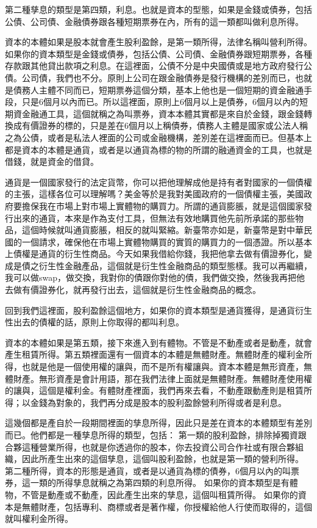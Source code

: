 \documentclass[]{ctexbook}
\begin{document}
第二種孳息的類型是第四類，利息。也就是資本的型態，如果是金錢或債券，包括公債、公司債、金融債券跟各種短期票券在內，所有的這一類都叫做利息所得。

資本的本體如果是股本就會產生股利盈餘，是第一類所得，法律名稱叫營利所得。如果你的資本類型是金錢或債券，包括公債、公司債、金融債券跟短期票券，各種存款跟其他貸出款項之利息。在這裡面，公債不分是中央國債或是地方政府發行公債。公司債，我們也不分。原則上公司在跟金融債券是發行機構的差別而已，也就是債務人主體不同而已，短期票券這個分類，基本上他也是一個短期的資金融通手段，只是6個月以內而已。所以這裡面，原則上6個月以上是債券，6個月以內的短期資金融通工具，這個就稱之為叫票券，資本本體其實都是來自於金錢，跟金錢轉換成有價證券的標的，只是差在6個月以上稱債券，債務人主體是國家或公法人稱之為公債，或者是私法人裡面的公司或金融機構，差別差在這裡面而已。但基本上都是資本的本體是通貨，或者是以通貨為標的物的所謂的融通資金的工具，也就是借錢，就是資金的借貸。

通貨是一個國家發行的法定貨幣，你可以把他理解成他是持有者對國家的一個債權的主張，這樣各位可以理解嗎？美金等於是我對美國政府的一個債權主張，美國政府要擔保我在市場上對市場上實體物的購買力。所謂的通貨膨脹，就是這個國家發行出來的通貨，本來是作為支付工具，但無法有效地購買他先前所承諾的那些物品，這個時候就叫通貨膨脹，相反的就叫緊縮。新臺幣亦如是，新臺幣是對中華民國的一個請求，確保他在市場上實體物購買的實質的購買力的一個憑證。所以基本上債權是通貨的衍生性商品。今天如果我借給你錢，我把他拿去做有價證券化，變成是債之衍生性金融產品，這個就是衍生性金融商品的類型態樣。我可以再繼續，我可以做swap，做交換，我對你的債跟你對他的債，我們做交換，然後我再把他去做有價證券化，就再發行出去，這個就是衍生性金融商品的概念。

回到我們這裡面，股利盈餘這個地方，如果你的資本類型是通貨獲得，是通貨衍生性出去的債權的話，原則上你取得的都叫利息。

資本的本體如果是第五類，接下來進入到有體物。不管是不動產或者是動產，就會產生租賃所得。第五類裡面還有一個資本的本體是無體財產。無體財產的權利金所得，也就是他是一個使用權的讓與，而不是所有權讓與。資本本體是無形資產，無體財產。無形資產是會計用語，那在我們法律上面就是無體財產。無體財產使用權的讓與，這個是權利金。有體財產裡面，我們再來去看，不動產跟動產則是租賃所得；以金錢為對象的，我們再分成是股本的股利盈餘營利所得或者是利息。

這幾個都是產自於一段期間裡面的孳息所得，因此只是差在資本的本體類型有差別而已。他們都是一種孳息所得的類型，包括：
第一類的股利盈餘，排除掉獨資跟合夥這種營業所得，也就是你透過你的股本，你去投資公司合作社或有限合夥組織，因此所產生出來的這個孳息，這個叫股利盈餘，也就是第一類的營利所得。
第二種所得，資本的形態是通貨，或者是以通貨為標的債券，6個月以內的叫票券，這一類的所得孳息就稱之為第四類的利息所得。
如果你的資本類型是有體物，不管是動產或不動產，因此產生出來的孳息，這個叫租賃所得。
如果你的資本是無體財產，包括專利、商標或者是著作權，你授權給他人行使而取得的，這個就叫權利金所得。
\end{document}
